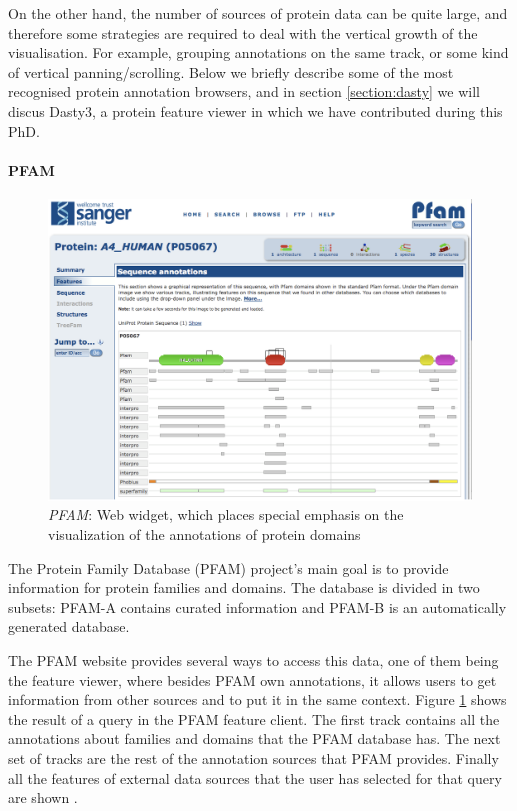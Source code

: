 On the other hand, the number of sources of protein data can be quite large, and therefore some strategies are required to deal with the vertical growth of the visualisation. For example, grouping annotations on the same track, or some kind of vertical panning/scrolling. Below we briefly describe some of the most recognised protein annotation browsers, and in section \ref{section:dasty} we will discus Dasty3, a protein feature viewer in which we have contributed during this PhD.

\paragraph{PFAM} 

\begin{figure}[ht]
\centering
\includegraphics[width=6in]{figures/pfam.png} 
\caption[PFAM Snapshot] {\emph{PFAM}: Web widget, which places special emphasis on the visualization of the annotations of protein domains} \label{fig: pfam}
\end{figure}

The Protein Family Database (PFAM) project's main goal is to provide information for protein families and domains. The database is divided in two subsets: PFAM-A contains curated information and PFAM-B is an automatically generated database. 

The PFAM website provides several ways to access this data, one of them being the feature viewer, where besides PFAM own annotations, it allows users to get information from other sources and to put it in the same context. Figure \ref{fig: pfam} shows the result of a query in the PFAM feature client. The first track contains all the annotations about families and domains that the PFAM database has. The next set of tracks are the rest of the annotation sources that PFAM provides. Finally all the features of external data sources that the user has selected for that query are shown \cite{FIN2008}.

